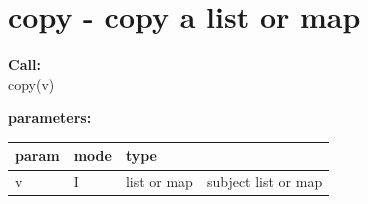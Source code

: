 %        
%        
%        
%        
%
%        
%        



    \section{copy - copy a list or map}\label{sec:ifcopy}
        
        {\bf Call:} \\
        copy(v)
        
        {\bf parameters:} \\
        \begin{tabular}{| l | l | l | l |}
        \hline
        param  & mode & type & \\
        \hline \hline
        v & I & list or map & subject list or map   \\ \hline
        \end{tabular}
        
